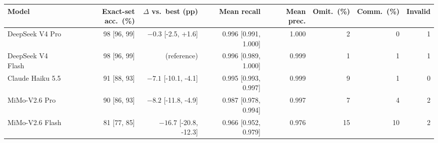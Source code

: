\begin{tabular}{lrrrrrrr}
\toprule
Model & Exact-set acc.\ (\%) & $\Delta$ vs.\ best (pp) & Mean recall & Mean prec. & Omit.\ (\%) & Comm.\ (\%) & Invalid \\
\midrule
DeepSeek V4 Pro & 98 [96, 99] & $-0.3$ [-2.5, +1.6] & 0.996 [0.991, 1.000] & 1.000 & 2 & 0 & 1 \\
DeepSeek V4 Flash & 98 [96, 99] & (reference) & 0.996 [0.989, 1.000] & 0.999 & 1 & 1 & 1 \\
Claude Haiku 5.5 & 91 [88, 93] & $-7.1$ [-10.1, -4.1] & 0.995 [0.993, 0.997] & 0.999 & 9 & 1 & 0 \\
MiMo-V2.6 Pro & 90 [86, 93] & $-8.2$ [-11.8, -4.9] & 0.987 [0.978, 0.994] & 0.997 & 7 & 4 & 2 \\
MiMo-V2.6 Flash & 81 [77, 85] & $-16.7$ [-20.8, -12.3] & 0.966 [0.952, 0.979] & 0.976 & 15 & 10 & 2 \\
\bottomrule
\end{tabular}
